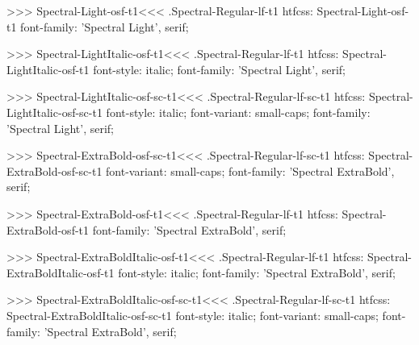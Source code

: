 >>>
\<Spectral-Light-osf-t1\><<<
.Spectral-Regular-lf-t1
htfcss:  Spectral-Light-osf-t1  font-family: 'Spectral Light', serif;

>>>
\<Spectral-LightItalic-osf-t1\><<<
.Spectral-Regular-lf-t1
htfcss:  Spectral-LightItalic-osf-t1  font-style: italic; font-family: 'Spectral Light', serif;

>>>
\<Spectral-LightItalic-osf-sc-t1\><<<
.Spectral-Regular-lf-sc-t1
htfcss:  Spectral-LightItalic-osf-sc-t1  font-style: italic; font-variant: small-caps; font-family: 'Spectral Light', serif;

>>>
\<Spectral-ExtraBold-osf-sc-t1\><<<
.Spectral-Regular-lf-sc-t1
htfcss:  Spectral-ExtraBold-osf-sc-t1  font-variant: small-caps; font-family: 'Spectral ExtraBold', serif;

>>>
\<Spectral-ExtraBold-osf-t1\><<<
.Spectral-Regular-lf-t1
htfcss:  Spectral-ExtraBold-osf-t1  font-family: 'Spectral ExtraBold', serif;

>>>
\<Spectral-ExtraBoldItalic-osf-t1\><<<
.Spectral-Regular-lf-t1
htfcss:  Spectral-ExtraBoldItalic-osf-t1  font-style: italic; font-family: 'Spectral ExtraBold', serif;

>>>
\<Spectral-ExtraBoldItalic-osf-sc-t1\><<<
.Spectral-Regular-lf-sc-t1
htfcss:  Spectral-ExtraBoldItalic-osf-sc-t1  font-style: italic; font-variant: small-caps; font-family: 'Spectral ExtraBold', serif;

